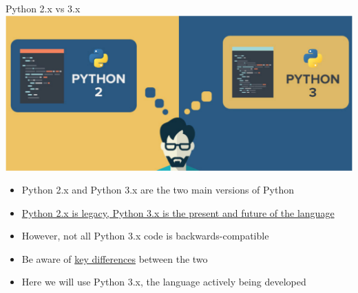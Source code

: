 \documentclass[pdf]{beamer}
\begin{document}
\begin{frame}{Python 2.x vs 3.x}
\centering
\includegraphics[width=.6\textwidth]{python2vs3.pdf}

\begin{itemize}\addtolength{\itemsep}{0.3\baselineskip}
	\item<1-> Python 2.x and Python 3.x are the two main versions of Python
	\item<2-> \href{https://wiki.python.org/moin/Python2orPython3}{Python 2.x is legacy, Python 3.x is the present and future of the language}
	\item<3-> However, not all Python 3.x code is backwards-compatible
	\item<4-> Be aware of \href{http://sebastianraschka.com/Articles/2014_python_2_3_key_diff.html}{key differences} between the two
	\item<5-> Here we will use Python 3.x, the language actively being developed
\end{itemize}
\end{frame}
\end{document}

